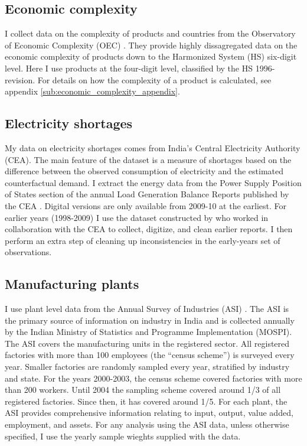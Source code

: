 \documentclass[11pt]{article}
\begin{document}
\subsection{Economic complexity}%
\label{sub:international_trade_data}
I collect data on the complexity of products and countries from the Observatory of Economic Complexity (OEC) \citep{simoes_economic_2011}. They provide highly dissagregated data on the economic complexity of products down to the Harmonized System (HS) six-digit level. Here I use products at the four-digit level, classified by the HS 1996-revision. For details on how the complexity of a product is calculated, see appendix \ref{sub:economic_complexity_appendix}.

\subsection{Electricity shortages}%
\label{sub:energy_data}
My data on electricity shortages comes from India's Central Electricity Authority (CEA). The main feature of the dataset is a measure of shortages based on the difference between the observed consumption of electricity and the estimated counterfactual demand. I extract the energy data from the Power Supply Position of States section of the annual Load Generation Balance Reports published by the CEA \citep{cea_load_2009}. Digital versions are only available from 2009-10 at the earliest. For earlier years (1998-2009) I use the dataset constructed by \cite{allcott_how_2016} who worked in collaboration with the CEA to collect, digitize, and clean earlier reports. I then perform an extra step of cleaning up inconsistencies in the early-years set of observations.

\subsection{Manufacturing plants}%
\label{sub:plant_data}
I use plant level data from the Annual Survey of Industries (ASI) \citep{mospi_annual_2000-1}. The ASI is the primary source of information on industry in India and is collected annually by the Indian Ministry of Statistics and Programme Implementation (MOSPI). The ASI covers the manufacturing units in the registered sector. All registered factories with more than 100 employees (the ``census scheme'') is surveyed every year. Smaller factories are randomly sampled every year, stratified by industry and state. For the years 2000-2003, the census scheme covered factories with more than 200 workers. Until 2004 the sampling scheme covered around 1/3 of all registered factories. Since then, it has covered around 1/5. For each plant, the ASI provides comprehensive information relating to input, output, value added, employment, and assets. For any analysis using the ASI data, unless otherwise specified, I use the yearly sample wieghts supplied with the data.
\end{document}
